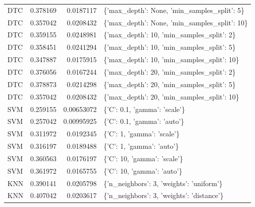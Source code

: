 \documentclass[conference,onecolumn]{IEEEtran}
\begin{document}
\begin{table}
\begin{center}
\begin{longtable}{lrrl}
             DTC          &   0.378169 &       0.0187117  & \{'max\_depth': None, 'min\_samples\_split': 5\}                       \\
             DTC          &   0.357042 &       0.0208432  & \{'max\_depth': None, 'min\_samples\_split': 10\}                      \\
             DTC          &   0.359155 &       0.0248981  & \{'max\_depth': 10, 'min\_samples\_split': 2\}                         \\
             DTC          &   0.358451 &       0.0241294  & \{'max\_depth': 10, 'min\_samples\_split': 5\}                         \\
             DTC          &   0.347887 &       0.0175915  & \{'max\_depth': 10, 'min\_samples\_split': 10\}                        \\
             DTC          &   0.376056 &       0.0167244  & \{'max\_depth': 20, 'min\_samples\_split': 2\}                         \\
             DTC          &   0.378873 &       0.0214298  & \{'max\_depth': 20, 'min\_samples\_split': 5\}                         \\
             DTC          &   0.357042 &       0.0208432  & \{'max\_depth': 20, 'min\_samples\_split': 10\}                        \\
             SVM          &   0.259155 &       0.00653072 & \{'C': 0.1, 'gamma': 'scale'\}                                      \\
             SVM          &   0.257042 &       0.00995925 & \{'C': 0.1, 'gamma': 'auto'\}                                       \\
             SVM          &   0.311972 &       0.0192345  & \{'C': 1, 'gamma': 'scale'\}                                        \\
             SVM          &   0.316197 &       0.0189488  & \{'C': 1, 'gamma': 'auto'\}                                         \\
             SVM          &   0.360563 &       0.0176197  & \{'C': 10, 'gamma': 'scale'\}                                       \\
             SVM          &   0.361972 &       0.0165755  & \{'C': 10, 'gamma': 'auto'\}                                        \\
             KNN          &   0.390141 &       0.0205798  & \{'n\_neighbors': 3, 'weights': 'uniform'\}                          \\
             KNN          &   0.407042 &       0.0203617  & \{'n\_neighbors': 3, 'weights': 'distance'\}                         \\

\end{longtable}
\end{center}
\end{table}
\end{document}
